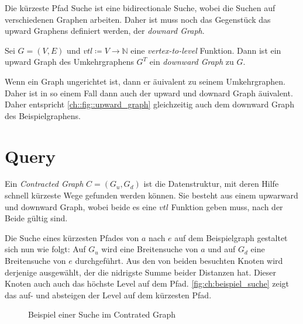 Die kürzeste Pfad Suche ist eine bidirectionale Suche, wobei die Suchen auf verschiedenen Graphen arbeiten.
Daher ist muss noch das Gegenstück das upward Graphens definiert werden, der \emph{downard Graph}.

\begin{definition}
    Sei $G = (V, E)$ und ${vtl} \coloneq V \to \mathbb{N}$ eine \emph{vertex-to-level} Funktion. Dann ist ein upward Graph des Umkehrgraphens $G^T$ ein \emph{downward Graph} zu $G$.
\end{definition}

Wenn ein Graph ungerichtet ist, dann er äuivalent zu seinem Umkehrgraphen.
Daher ist in so einem Fall dann auch der upward und downard Graph äuivalent.
Daher entspricht \autoref{ch::fig::upward_graph} gleichzeitig auch dem downward Graph des Beispielgraphens.

\section{Query}

Ein \emph{Contracted Graph} $C = (G_u, G_d)$ ist die Datenstruktur, mit deren Hilfe schnell kürzeste Wege gefunden werden können.
Sie besteht aus einem upwarward und downward Graph, wobei beide es eine ${vtl}$ Funktion geben muss, nach der Beide gültig sind.

Die Suche eines kürzesten Pfades von $a$ nach $e$ auf dem Beispielgraph gestaltet sich nun wie folgt:
Auf $G_u$ wird eine Breitensuche von $a$ und auf $G_d$ eine Breitensuche von $e$ durchgeführt.
Aus den von beiden besuchten Knoten wird derjenige ausgewählt, der die nidrigste Summe beider Distanzen hat.
Dieser Knoten auch auch das höchste Level auf dem Pfad.
\autoref{fig:ch:beispiel_suche} zeigt das auf- und absteigen der Level auf dem kürzesten Pfad.

\begin{figure}[ht]
    \centering
    \caption{Beispiel einer Suche im Contrated Graph}
    \label{fig:ch:beispiel_suche}
\end{figure}


